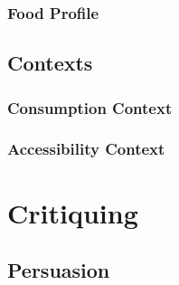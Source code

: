 \subsection{Food Profile}

\section{Contexts}

\subsection{Consumption Context}

\subsection{Accessibility Context}

\chapter{Critiquing}

\section{Persuasion}